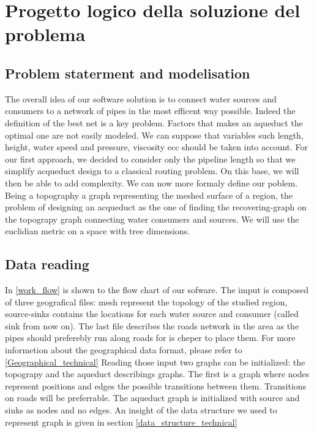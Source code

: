 \chapter{Progetto logico della soluzione del problema}
\label{capitolo4}
\thispagestyle{empty}

\section{Problem staterment and modelisation}
The overall idea of our software solution is to connect water sources and consumers to a network of 
pipes in the most efficent way possible. Indeed the definition of the best net is a key problem. 
Factors that makes an aqueduct the optimal one are not easily modeled. We can suppose that variables 
such length, height, water speed and pressure, viscosity ecc should be taken into account.
\hfill For our first approach, we decided to consider only the pipeline length so that we simplify 
acqueduct design to a classical routing problem. On this base, we will then be able to add complexity.
\hfill We can now more formaly define our poblem. Being a topography a graph representing the meshed 
surface of a region, the problem of designing an acqueduct as the one of finding the recovering-graph 
on the topograpy graph connecting water consumers and sources. We will use the euclidian metric on a 
space with tree dimensions.



\section{Data reading}
In \ref{work_flow} is shown to the flow chart of our sofware. 
The imput is composed of three geografical files: mesh represent the topology of the studied region, 
source-sinks contains the locations for each water source and consumer (called sink from now on). 
The last file describes the roads network in the area as the pipes should preferebly run along roads 
for is cheper to place them. For more informetion about the geographical data format, please refer to
 \ref{Geographical_technical} Reading those input two graphs can be initialized: the topograpy and the 
 aqueduct describings graphs. The first is a graph where nodes represent positions and edges the 
 possible transitions between them. Transitions on roads will be preferrable. The aqueduct graph is 
 initialized with source and sinks as nodes and no edges. An insight of the data structure we used to 
 represent graph is given in section \ref{data_structure_technical}

